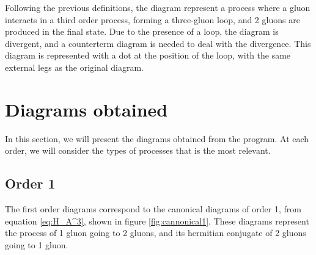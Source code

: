 \documentclass[11pt,a4paper,twoside,pdf]{article}
\numberwithin{equation}{section}
\begin{document}
Following the previous definitions, the diagram represent a process where a gluon
interacts in a third order process, forming a three-gluon loop, and 2 gluons are 
produced in the final state. Due to the presence of a loop, the diagram is
divergent, and a counterterm diagram is needed to deal with the divergence. This 
diagram is represented with a dot at the position of the loop, with the same 
external legs as the original diagram. 



\newpage

\section{Diagrams obtained} \label{sec:diagrams}

In this section, we will present the diagrams obtained from the program. At 
each order, we will consider the types of processes that is the most relevant.


\subsection{Order 1}

The first order diagrams correspond to the canonical diagrams of order 1, from equation
\eqref{eq:H_A^3}, shown in figure \ref{fig:cannonical1}. These diagrams represent the 
process of 1 gluon going to 2 gluons, and its hermitian conjugate of 2 gluons going to 1 gluon.
\end{document}
